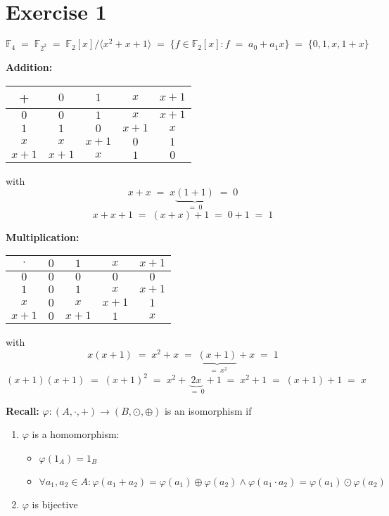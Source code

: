 \documentclass[a4paper]{scrreprt}
\newcommand\F{\mathbb F}
\begin{document}
\section*{Exercise 1}

$\F_4 \;=\; \F_{2^2} \;=\; \F_2[x]/\langle x^2+x+1 \rangle \;=\; \{ f\in\F_2[x]:f\;=\;a_0+a_1x\}
        \;=\; \{0,1,x,1+x\}$

\vspace*{1em}
\textbf{Addition:}

\hspace*{1cm}\begin{tabular}{c||c|c|c|c}
    +  & $0$ & $1$ & $x$ & $x+1$ \\
    \hline
    \hline
    $0$ & $0$ & $1$ & $x$ & $x+1$ \\
    \hline
    $1$ & $1$ & $0$ & $x+1$ & $x$ \\
    \hline
    $x$ & $x$ & $x+1$ & $0$ & $1$ \\
    \hline
    $x+1$ & $x+1$ & $x$ & $1$ & $0$ \\
\end{tabular}

with
\[x+x \;=\; x\underbrace{(1+1)}_{=\;0} \;=\; 0\]
\[x+x+1 \;=\; (x+x)+1 \;=\; 0+1 \;=\; 1\]

\vspace*{1.5em}
\textbf{Multiplication:}

\hspace*{1cm}\begin{tabular}{c||c|c|c|c}
    $\cdot$  & \hspace*{0.9em}$0$\hspace*{0.9em} & $1$ & $x$ & $x+1$ \\
    \hline
    \hline
    $0$ & $0$ & $0$ & $0$ & $0$ \\
    \hline
    $1$ & $0$ & $1$ & $x$ & $x+1$ \\
    \hline
    $x$ & $0$ & $x$ & $x+1$ & $1$ \\
    \hline
    $x+1$ & $0$ & $x+1$ & $1$ & $x$ \\
\end{tabular}

with
\[x(x+1) \;=\; x^2+x \;=\; \underbrace{(x+1)}_{\;=\;x^2}+x \;=\; 1\]
\[(x+1)(x+1) \;=\; (x+1)^2 \;=\; x^2+\underbrace{2x}_{\;=\;0} + 1 \;=\; x^2+1 \;=\; (x+1)+1 \;=\; x\]

\textbf{Recall:} $\varphi:(A,\cdot,+) \rightarrow (B,\odot,\oplus)$ is an isomorphism if
\begin{enumerate}[label=(\roman*)]
    \item $\varphi$ is a homomorphism:
        \begin{itemize}
            \item $\varphi(1_A) = 1_B$
            \item $\forall a_1, a_2\in A: \varphi(a_1+a_2) = \varphi(a_1)\oplus\varphi(a_2)
                    \wedge \varphi(a_1\cdot a_2) = \varphi(a_1)\odot\varphi(a_2)$
        \end{itemize}
    \item $\varphi$ is bijective
\end{enumerate}
\end{document}
